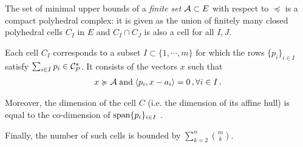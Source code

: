 \documentclass[main]{subfiles}
\begin{document}
\begin{proposition}
The set of minimal upper bounds of a \emph{finite set} $\mathcal{A} \subset E$ with respect to $\preceq$ is a compact polyhedral complex: it is given as  the union of finitely many closed polyhedral cells $C_I$ in $E$ and $C_I \cap C_J$ is also a cell for all $I,J$.

Each cell $C_I$ corresponds to a subset $I \subset \{ 1, \cdots, m\}$ for which the rows $\{p_i\}_{i \in I}$ satisfy $\sum_{i\in I} p_i \in \mathcal{C}_P^\star$. It consists of 
 the vectors $x$ such that
\begin{align*}
x \succcurlyeq \mathcal{A}\;\text{and}\; \langle { p_i} , {x -a_i } \rangle = 0 \,, \forall i \in I \,.
\end{align*}

Moreover, the dimension of the cell $C$ (i.e. the dimension of its affine hull) is equal to the co-dimension of $\operatorname{span} \{p_i\}_{i \in I}$ .

Finally, the number of such cells is bounded by $\sum_{k = 2}^n \binom{m}{k}$.
\end{proposition}
\end{document}
